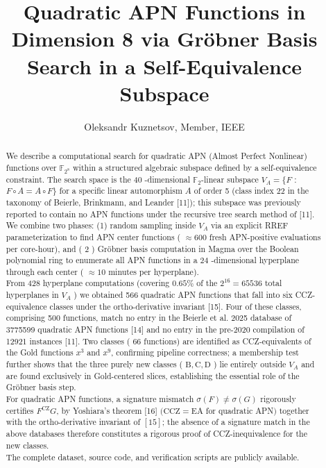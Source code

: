 \documentclass[10pt]{article}
\title{Quadratic APN Functions in Dimension 8 via Gröbner Basis Search in a Self-Equivalence Subspace }
\author{Oleksandr Kuznetsov, Member, IEEE}
\date{}
\begin{document}
\maketitle
\captionsetup{singlelinecheck=false}


\begin{abstract}
We describe a computational search for quadratic APN (Almost Perfect Nonlinear) functions over $\mathbb{F}_{2^{8}}$ within a structured algebraic subspace defined by a self-equivalence constraint. The search space is the 40 -dimensional $\mathbb{F}_{2}$-linear subspace $V_{A}=\{F$ : $F \circ A=A \circ F\}$ for a specific linear automorphism $A$ of order 5 (class index 22 in the taxonomy of Beierle, Brinkmann, and Leander [11]); this subspace was previously reported to contain no APN functions under the recursive tree search method of [11].\\
We combine two phases: (1) random sampling inside $V_{A}$ via an explicit RREF parameterization to find APN center functions ( $\approx 600$ fresh APN-positive evaluations per core-hour), and ( 2 ) Gröbner basis computation in Magma over the Boolean polynomial ring to enumerate all APN functions in a 24 -dimensional hyperplane through each center ( $\approx 10$ minutes per hyperplane).\\
From 428 hyperplane computations (covering $0.65 \%$ of the $2^{16}=65536$ total hyperplanes in $V_{A}$ ) we obtained 566 quadratic APN functions that fall into six CCZ-equivalence classes under the ortho-derivative invariant [15]. Four of these classes, comprising 500 functions, match no entry in the Beierle et al. 2025 database of 3775599 quadratic APN functions [14] and no entry in the pre-2020 compilation of 12921 instances [11]. Two classes ( 66 functions) are identified as CCZ-equivalents of the Gold functions $x^{3}$ and $x^{9}$, confirming pipeline correctness; a membership test further shows that the three purely new classes ( $\mathrm{B}, \mathrm{C}, \mathrm{D}$ ) lie entirely outside $V_{A}$ and are found exclusively in Gold-centered slices, establishing the essential role of the Gröbner basis step.\\
For quadratic APN functions, a signature mismatch $\sigma(F) \neq \sigma(G)$ rigorously certifies $F{ }^{\mathrm{CZ}} G$, by Yoshiara's theorem [16] $(\mathrm{CCZ}=\mathrm{EA}$ for quadratic APN$)$ together with the ortho-derivative invariant of $[15]$; the absence of a signature match in the above databases therefore constitutes a rigorous proof of CCZ-inequivalence for the new classes.\\
The complete dataset, source code, and verification scripts are publicly available.
\end{abstract}
\end{document}
